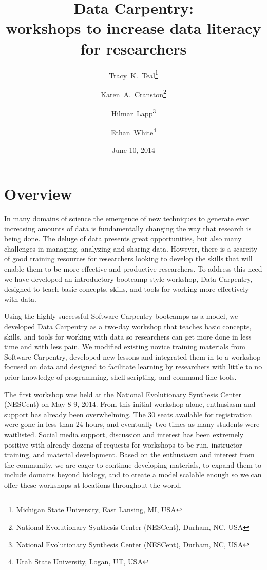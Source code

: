 \documentclass[11pt]{article}
\begin{document}
\title{Data Carpentry: \\workshops to increase data literacy for researchers}
\author{Tracy~K.~Teal\thanks{Michigan State University, East Lansing, MI, USA} \and Karen~A.~Cranston\thanks{National Evolutionary Synthesis Center (NESCent), Durham, NC, USA} \and Hilmar~Lapp\thanks{National Evolutionary Synthesis Center (NESCent), Durham, NC, USA} \and Ethan~White\thanks{Utah State University, Logan, UT, USA}}
\date{June 10, 2014}



\maketitle


\section{Overview }
In many domains of science the emergence of new techniques to generate
ever increasing amounts of data is fundamentally changing the way that
research is being done. The deluge of data presents great
opportunities, but also many challenges in managing, analyzing and
sharing data. However, there is a scarcity of good training resources for researchers
looking to develop the skills that will enable them to be more effective and
productive researchers. To address this need we have
developed an introductory bootcamp-style workshop, Data Carpentry,
designed to teach basic concepts, skills, and tools for working more
effectively with data.

Using the highly successful Software Carpentry bootcamps as a model,
we developed Data Carpentry as a two-day workshop that teaches basic
concepts, skills, and tools for working with data so researchers can
get more done in less time and with less pain. We modified existing
novice training materials from Software Carpentry,
developed new lessons and integrated them in to a workshop focused on 
data and designed to
facilitate learning by researchers with little to no prior knowledge of
programming, shell scripting, and command line tools.

The first workshop was held at the National Evolutionary Synthesis
Center (NESCent) on May 8-9, 2014. From this initial workshop alone,
enthusiasm and support has already been overwhelming. The 30 seats
available for registration were gone in less than 24 hours, and
eventually two times as many students were waitlisted. Social media
support, discussion and interest has been extremely positive with
already dozens of requests for workshops to be run, instructor
training, and material development. Based on the enthusiasm and
interest from the community, we are eager to continue developing
materials, to expand them to include domains beyond biology, and to
create a model scalable enough so we can offer these workshops at
locations throughout the world.
\end{document}
